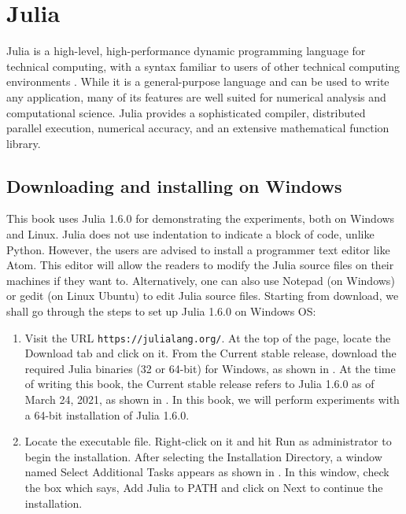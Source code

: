 
\section{Julia} \label{sec:julia-start}
Julia is a high-level, high-performance dynamic programming language for
technical computing, with a syntax familiar to users of other technical computing
environments \cite{julia-ref}. While it is a general-purpose language and can be used to write any
application, many of its features are well suited for numerical analysis and
computational science. Julia provides a sophisticated compiler, distributed
parallel execution, numerical accuracy, and an extensive mathematical function
library.


\subsection{Downloading and installing on Windows} \label{julia-install-windows}
This book uses Julia 1.6.0 for demonstrating the experiments, both on Windows and Linux.
Julia does not use indentation to indicate a block of code, unlike Python. However,
the users are advised to install a programmer text editor like Atom. This editor will
allow the readers to modify the Julia source files on their machines if they want to.
Alternatively, one can also use Notepad (on Windows) or gedit (on Linux Ubuntu) to edit
Julia source files. Starting from download, we shall go through the steps to set
up Julia 1.6.0 on Windows OS:
\begin{enumerate}
      \item Visit the URL {\tt https://julialang.org/}.  At the top of the page,
            locate the Download tab and click on it. From the Current stable release,
            download the required Julia binaries (32 or 64-bit) for Windows, as shown in .
            At the time of writing this book, the Current stable release refers to Julia 1.6.0
            as of March 24, 2021, as shown in . In this book, we will perform
            experiments with a 64-bit installation of Julia 1.6.0.
      \item Locate the executable file. Right-click on it and hit
            Run as administrator to begin the installation. After selecting the Installation Directory,
            a window named Select Additional Tasks appears as shown in .
            In this window, check the box which says, Add Julia to PATH and click on Next to continue the installation.
\end{enumerate}

